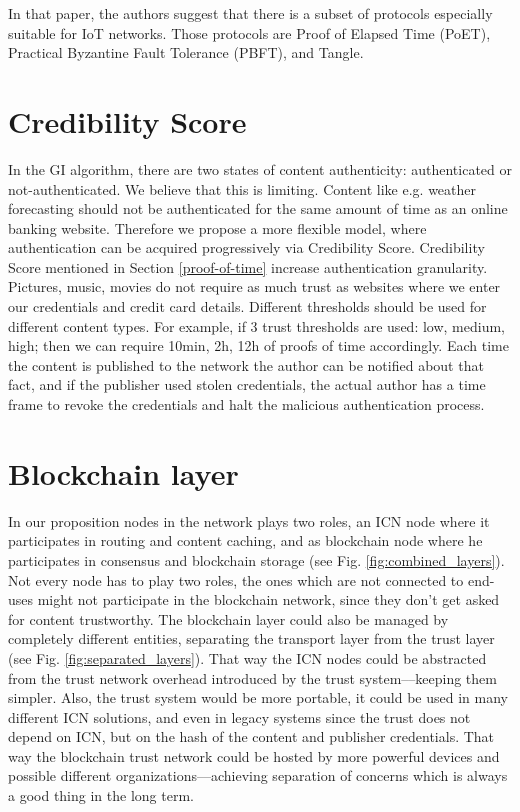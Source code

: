 In that paper, the authors suggest that there is a subset of protocols especially suitable for IoT networks. Those protocols are Proof of Elapsed Time (PoET), Practical Byzantine Fault Tolerance (PBFT), and Tangle.

\section{Credibility Score}
In the GI algorithm, there are two states of content authenticity: authenticated or not-authenticated. We believe that this is limiting. Content like e.g. weather forecasting should not be authenticated for the same amount of time as an online banking website. Therefore we propose a more flexible model, where authentication can be acquired progressively via Credibility Score. Credibility Score mentioned in Section \ref{proof-of-time} increase authentication granularity. Pictures, music, movies do not require as much trust as websites where we enter our credentials and credit card details. Different thresholds should be used for different content types. For example, if 3 trust thresholds are used: low, medium, high; then we can require 10min, 2h, 12h of proofs of time accordingly. Each time the content is published to the network the author can be notified about that fact, and if the publisher used stolen credentials, the actual author has a time frame to revoke the credentials and halt the malicious authentication process.

\section{Blockchain layer}
In our proposition nodes in the network plays two roles, an ICN node where it participates in routing and content caching, and as blockchain node where he participates in consensus and blockchain storage (see Fig. \ref{fig:combined_layers}). Not every node has to play two roles, the ones which are not connected to end-uses might not participate in the blockchain network, since they don't get asked for content trustworthy. 
The blockchain layer could also be managed by completely different entities, separating the transport layer from the trust layer (see Fig. \ref{fig:separated_layers}). That way the ICN nodes could be abstracted from the trust network overhead introduced by the trust system––keeping them simpler. Also, the trust system would be more portable, it could be used in many different ICN solutions, and even in legacy systems since the trust does not depend on ICN, but on the hash of the content and publisher credentials. That way the blockchain trust network could be hosted by more powerful devices and possible different organizations––achieving separation of concerns which is always a good thing in the long term.

